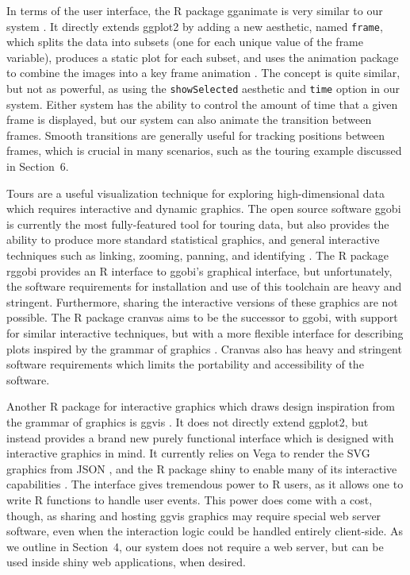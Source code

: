 \documentclass[journal]{vgtc}\usepackage[]{graphicx}\usepackage[]{color}
\begin{document}

In terms of the user interface, the R package gganimate is very similar to our system \citep{gganimate}. It directly extends ggplot2 by adding a new aesthetic, named \texttt{frame}, which splits the data into subsets (one for each unique value of the frame variable), produces a static plot for each subset, and uses the animation package to combine the images into a key frame animation \citep{animation}. The concept is quite similar, but not as powerful, as using the \texttt{showSelected} aesthetic and \texttt{time} option in our system. Either system has the ability to control the amount of time that a given frame is displayed, but our system can also animate the transition between frames. Smooth transitions are generally useful for tracking positions between frames, which is crucial in many scenarios, such as the touring example discussed in Section~6.

Tours are a useful visualization technique for exploring high-dimensional data which requires interactive and dynamic graphics. The open source software ggobi is currently the most fully-featured tool for touring data, but also provides the ability to produce more standard statistical graphics, and general interactive techniques such as linking, zooming, panning, and identifying \citep{ggobi:2007}. The R package rggobi \citep{rggobi} provides an R interface to ggobi's graphical interface, but unfortunately, the software requirements for installation and use of this toolchain are heavy and stringent. Furthermore, sharing the interactive versions of these graphics are not possible. The R package cranvas aims to be the successor to ggobi, with support for similar interactive techniques, but with a more flexible interface for describing plots inspired by the grammar of graphics \citep{cranvas}. Cranvas also has heavy and stringent software requirements which limits the portability and accessibility of the software.

Another R package for interactive graphics which draws design inspiration from the grammar of graphics is ggvis \citep{ggvis}. It does not directly extend ggplot2, but instead provides a brand new purely functional interface which is designed with interactive graphics in mind. It currently relies on Vega to render the SVG graphics from JSON \citep{vega}, and the R package shiny to enable many of its interactive capabilities \citep{shiny}. The interface gives tremendous power to R users, as it allows one to write R functions to handle user events. This power does come with a cost, though, as sharing and hosting ggvis graphics may require special web server software, even when the interaction logic could be handled entirely client-side. As we outline in Section~4, our system does not require a web server, but can be used inside shiny web applications, when desired.
\end{document}
